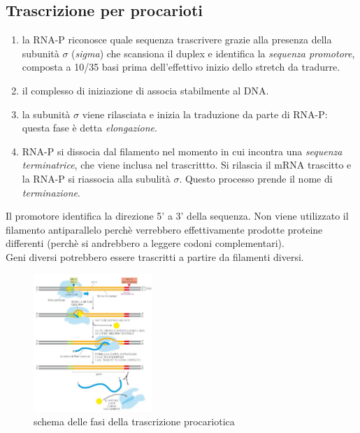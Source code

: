     \subsection{Trascrizione per procarioti}
        \begin{enumerate}
            \item la RNA-P riconosce quale sequenza trascrivere grazie alla presenza della subunità $\sigma$ (\textit{sigma}) che scansiona il duplex e identifica la \textit{sequenza promotore}, composta a 10/35 basi prima dell'effettivo inizio dello stretch da tradurre. 
            \item il complesso di iniziazione di associa stabilmente al DNA.
            \item la subunità $\sigma$ viene rilasciata e inizia la traduzione da parte di RNA-P: questa fase è detta \textit{elongazione}.
            \item RNA-P si dissocia dal filamento nel momento in cui incontra una \textit{sequenza terminatrice}, che viene inclusa nel trascrittto. Si rilascia il mRNA trascitto e la RNA-P si riassocia alla subulità $\sigma$. Questo processo prende il nome di \textit{terminazione}.
        \end{enumerate} 
        Il promotore identifica la direzione 5' a 3' della sequenza. Non viene utilizzato il filamento antiparallelo perchè verrebbero effettivamente prodotte proteine differenti (perchè si andrebbero a leggere codoni complementari).\\
        Geni diversi potrebbero essere trascritti a partire da filamenti diversi.
        \begin{figure}[h]
            \centering
            \includegraphics[width=0.4\textwidth]{images/trascrizioneProka.JPG}
            \caption{\small schema delle fasi della trascrizione procariotica}
            \label{fig:mesh1}
        \end{figure}
    

